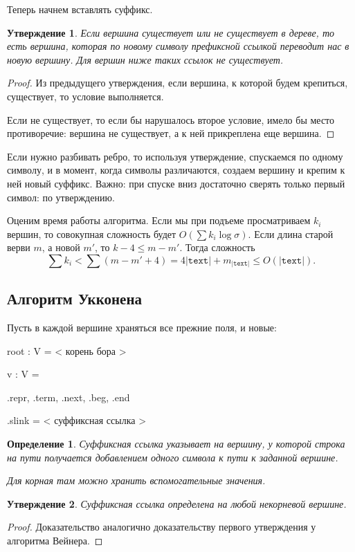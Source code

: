 \documentclass[10pt]{book}
\theoremstyle{plain}
\newtheorem{stm}{Утверждение}[section]
\newtheorem{definition}{Определение}[section]
\newcommand{\textm}{\texttt{text}}
\begin{document}
Теперь начнем вставлять суффикс.

\begin{stm}
  Если вершина существует или не существует в дереве, то есть вершина, которая
  по новому символу префиксной ссылкой переводит нас в новую вершину. Для вершин
  ниже таких ссылок не существует.
\end{stm}
\begin{proof}
  Из предыдущего утверждения, если вершина, к которой будем крепиться,
  существует, то условие выполняется.

  Если не существует, то если бы нарушалось второе условие, имело бы место
  противоречие: вершина не существует, а к ней прикреплена еще вершина.
\end{proof}

Если нужно разбивать ребро, то используя утверждение, спускаемся по одному
символу, и в момент, когда символы различаются, создаем вершину и крепим к ней
новый суффикс. Важно: при спуске вниз достаточно сверять только первый символ:
по утверждению.

Оценим время работы алгоритма. Если мы при подъеме просматриваем $k_i$ вершин,
то совокупная сложность будет $O(\sum k_i \log \sigma)$. Если длина старой
верви $m$, а новой $m'$, то $k - 4 \le m - m'$. Тогда сложность
$$\sum k_i < \sum (m - m' + 4) = 4|\textm| + m_|\textm| \le O(|\textm|).$$

\subsection{Алгоритм Укконена}

Пусть в каждой вершине храняться все прежние поля, и новые:
\begin{verbm}
  root : V = < корень бора >
  
  v : V = {
    .repr, .term, .next, .beg, .end

    .slink = < суффиксная ссылка >
  }
\end{verbm}

\begin{definition}
  Суффиксная ссылка указывает на вершину, у которой строка на пути
  получается добавлением одного символа к пути к заданной вершине.

  Для корная там можно хранить вспомогательные значения.
\end{definition}

\begin{stm}
  Суффиксная ссылка определена на любой некорневой вершине.
\end{stm}
\begin{proof}
  Доказательство аналогично доказательству первого утверждения у алгоритма
  Вейнера.
\end{proof}
\end{document}
